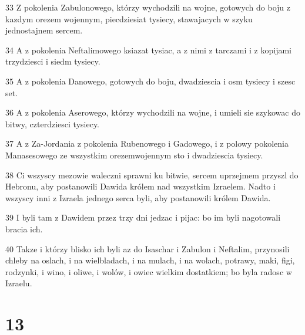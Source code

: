\par 33 Z pokolenia Zabulonowego, którzy wychodzili na wojne, gotowych do boju z kazdym orezem wojennym, piecdziesiat tysiecy, stawajacych w szyku jednostajnem sercem.
\par 34 A z pokolenia Neftalimowego ksiazat tysiac, a z nimi z tarczami i z kopijami trzydziesci i siedm tysiecy.
\par 35 A z pokolenia Danowego, gotowych do boju, dwadziescia i osm tysiecy i szesc set.
\par 36 A z pokolenia Aserowego, którzy wychodzili na wojne, i umieli sie szykowac do bitwy, czterdziesci tysiecy.
\par 37 A z Za-Jordania z pokolenia Rubenowego i Gadowego, i z polowy pokolenia Manasesowego ze wszystkim orezemwojennym sto i dwadziescia tysiecy.
\par 38 Ci wszyscy mezowie waleczni sprawni ku bitwie, sercem uprzejmem przyszl do Hebronu, aby postanowili Dawida królem nad wszystkim Izraelem. Nadto i wszyscy inni z Izraela jednego serca byli, aby postanowili królem Dawida.
\par 39 I byli tam z Dawidem przez trzy dni jedzac i pijac: bo im byli nagotowali bracia ich.
\par 40 Takze i którzy blisko ich byli az do Isaschar i Zabulon i Neftalim, przynosili chleby na oslach, i na wielbladach, i na mulach, i na wolach, potrawy, maki, figi, rodzynki, i wino, i oliwe, i wolów, i owiec wielkim dostatkiem; bo byla radosc w Izraelu.

\chapter{13}

